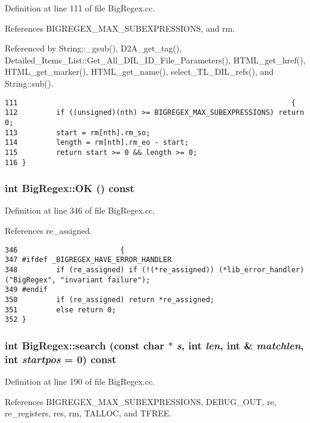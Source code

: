 Definition at line 111 of file Big\-Regex.cc.

References BIGREGEX\_\-MAX\_\-SUBEXPRESSIONS, and rm.

Referenced by String::\_\-gsub(), D2A\_\-get\_\-tag(), Detailed\_\-Items\_\-List::Get\_\-All\_\-DIL\_\-ID\_\-File\_\-Parameters(), HTML\_\-get\_\-href(), HTML\_\-get\_\-marker(), HTML\_\-get\_\-name(), select\_\-TL\_\-DIL\_\-refs(), and String::sub().



\footnotesize\begin{verbatim}111                                                                {
112         if ((unsigned)(nth) >= BIGREGEX_MAX_SUBEXPRESSIONS) return 0;
113         start = rm[nth].rm_so;
114         length = rm[nth].rm_eo - start;
115         return start >= 0 && length >= 0;
116 }
\end{verbatim}\normalsize 
{}
\subsubsection{\setlength{\rightskip}{0pt plus 5cm}int Big\-Regex::OK () const}\label{classBigRegex_a7}




Definition at line 346 of file Big\-Regex.cc.

References re\_\-assigned.



\footnotesize\begin{verbatim}346                        {
347 #ifdef _BIGREGEX_HAVE_ERROR_HANDLER
348         if (re_assigned) if (!(*re_assigned)) (*lib_error_handler)("BigRegex", "invariant failure");
349 #endif
350         if (re_assigned) return *re_assigned;
351         else return 0;
352 }
\end{verbatim}\normalsize 
{}
\subsubsection{\setlength{\rightskip}{0pt plus 5cm}int Big\-Regex::search (const char $\ast$ {\em s}, int {\em len}, int \& {\em matchlen}, int {\em startpos} = 0) const}\label{classBigRegex_a3}




Definition at line 190 of file Big\-Regex.cc.

References BIGREGEX\_\-MAX\_\-SUBEXPRESSIONS, DEBUG\_\-OUT, re, re\_\-registers, res, rm, TALLOC, and TFREE.

